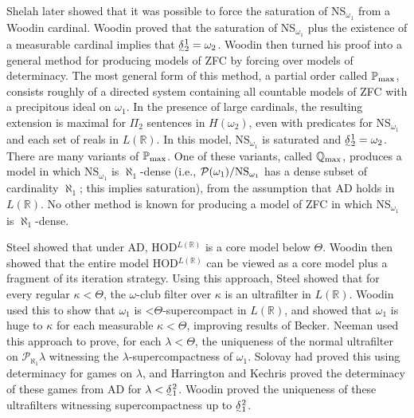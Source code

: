 \documentclass{book}%
\def\undertilde#1{{\baselineskip=0pt\vtop
  {\hbox{$#1$}\hbox{$\scriptscriptstyle\sim$}}}{}}
\newcommand{\less}{\mathord{<}}
\begin{document}
Shelah  later showed that it was possible to force
the saturation of NS$_{\omega_{1}}$ from a Woodin cardinal. Woodin
  proved that the saturation of NS$_{\omega_{1}}$
plus the existence of a measurable cardinal implies that
$\undertilde{\delta}^{1}_{2} = \omega_{2}$.  Woodin then turned his
proof into a general method for producing models of ZFC by forcing
over models of determinacy. The most general form of this method, a
partial order called $\mathbb{P}_{\rm max}$, consists roughly of a
directed system containing all countable models of ZFC with a precipitous
ideal on $\omega_{1}$. In the presence of large cardinals, the resulting
extension is maximal for $\Pi_{2}$ sentences in $H(\omega_{2})$, even
with predicates for NS$_{\omega_{1}}$ and each set of reals in
$L(\mathbb{R})$. In this model, NS$_{\omega_{1}}$ is saturated and
$\undertilde{\delta}^{1}_{2} = \omega_{2}$. There are many variants
of $\mathbb{P}_{\rm max}$. One of these variants, called
$\mathbb{Q}_{\rm max}$, produces a model in which NS$_{\omega_{1}}$
is $\aleph_{1}$-dense (i.e., $\mathcal{P}(\omega_{1})/{\rm NS}_{\omega_{1}}$ has a dense
subset of cardinality $\aleph_{1}$; this implies saturation), from the assumption that AD holds in
$L(\mathbb{R})$. No other method is known for producing a model of
ZFC in which NS$_{\omega_{1}}$ is $\aleph_{1}$-dense.


Steel  showed that under AD, HOD$^{L(\mathbb{R})}$
is a core model below $\Theta$. Woodin then showed that
the entire model HOD$^{L(\mathbb{R})}$ can be viewed as a core model plus a fragment of its
iteration strategy. Using this approach, Steel showed that for every
regular $\kappa < \Theta$, the $\omega$-club filter over $\kappa$ is
an ultrafilter in $L(\mathbb{R})$. Woodin used this
to show that
$\omega_{1}$ is $\less\Theta$-supercompact in $L(\mathbb{R})$, and
showed that $\omega_{1}$ is huge to $\kappa$ for each measurable
$\kappa < \Theta$, improving results of Becker. Neeman
 used this approach to prove, for each $\lambda < \Theta$, the uniqueness of the
normal ultrafilter on $\mathcal{P}_{\aleph_{1}} \lambda$ witnessing
the $\lambda$-supercompactness of $\omega_{1}$. Solovay had proved this using determinacy
for games on $\lambda$, and Harrington and Kechris
 proved the determinacy of these games
from AD for $\lambda < \undertilde{\delta}^{2}_{1}$. Woodin proved
the uniqueness of these ultrafilters witnessing supercompactness up to
$\undertilde{\delta}^{2}_{1}$.
\end{document}

